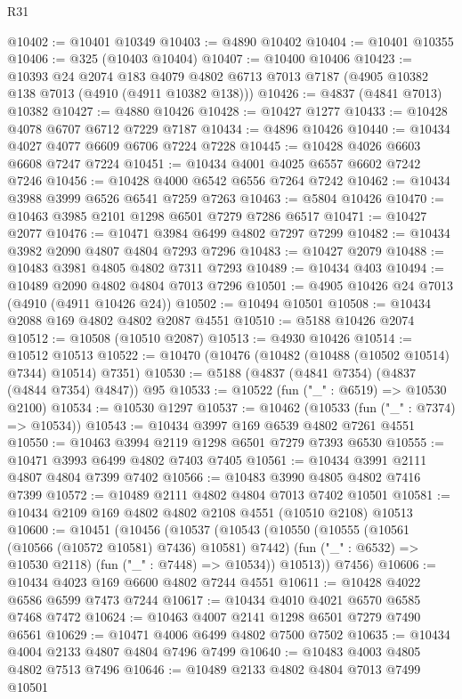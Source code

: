 \begin{lexlean}{R31}
\begin{coremodule}
@10402 := @10401 @10349
@10403 := @4890 @10402
@10404 := @10401 @10355
@10406 := @325 (@10403 @10404)
@10407 := @10400 @10406
@10423 := @10393
    @24
    @2074
    @183
    @4079
    @4802
    @6713
    @7013
    @7187
    (@4905 @10382 @138 @7013 (@4910 (@4911 @10382 @138)))
@10426 := @4837 (@4841 @7013) @10382
@10427 := @4880 @10426
@10428 := @10427 @1277
@10433 := @10428 @4078 @6707 @6712 @7229 @7187
@10434 := @4896 @10426
@10440 := @10434 @4027 @4077 @6609 @6706 @7224 @7228
@10445 := @10428 @4026 @6603 @6608 @7247 @7224
@10451 := @10434 @4001 @4025 @6557 @6602 @7242 @7246
@10456 := @10428 @4000 @6542 @6556 @7264 @7242
@10462 := @10434 @3988 @3999 @6526 @6541 @7259 @7263
@10463 := @5804 @10426
@10470 := @10463 @3985 @2101 @1298 @6501 @7279 @7286 @6517
@10471 := @10427 @2077
@10476 := @10471 @3984 @6499 @4802 @7297 @7299
@10482 := @10434 @3982 @2090 @4807 @4804 @7293 @7296
@10483 := @10427 @2079
@10488 := @10483 @3981 @4805 @4802 @7311 @7293
@10489 := @10434 @403
@10494 := @10489 @2090 @4802 @4804 @7013 @7296
@10501 := @4905 @10426 @24 @7013 (@4910 (@4911 @10426 @24))
@10502 := @10494 @10501
@10508 := @10434 @2088 @169 @4802 @4802 @2087 @4551
@10510 := @5188 @10426 @2074
@10512 := @10508 (@10510 @2087)
@10513 := @4930 @10426
@10514 := @10512 @10513
@10522 := @10470 (@10476 (@10482 (@10488 (@10502 @10514) @7344) @10514) @7351)
@10530 := @5188 (@4837 (@4841 @7354) (@4837 (@4844 @7354) @4847)) @95
@10533 := @10522 (fun ("_" : @6519) => @10530 @2100)
@10534 := @10530 @1297
@10537 := @10462 (@10533 (fun ("_" : @7374) => @10534))
@10543 := @10434 @3997 @169 @6539 @4802 @7261 @4551
@10550 := @10463 @3994 @2119 @1298 @6501 @7279 @7393 @6530
@10555 := @10471 @3993 @6499 @4802 @7403 @7405
@10561 := @10434 @3991 @2111 @4807 @4804 @7399 @7402
@10566 := @10483 @3990 @4805 @4802 @7416 @7399
@10572 := @10489 @2111 @4802 @4804 @7013 @7402 @10501
@10581 := @10434 @2109 @169 @4802 @4802 @2108 @4551 (@10510 @2108) @10513
@10600 := @10451
    (@10456
      (@10537
        (@10543
          (@10550
            (@10555 (@10561 (@10566 (@10572 @10581) @7436) @10581) @7442)
            (fun ("_" : @6532) => @10530 @2118)
            (fun ("_" : @7448) => @10534))
          @10513))
      @7456)
@10606 := @10434 @4023 @169 @6600 @4802 @7244 @4551
@10611 := @10428 @4022 @6586 @6599 @7473 @7244
@10617 := @10434 @4010 @4021 @6570 @6585 @7468 @7472
@10624 := @10463 @4007 @2141 @1298 @6501 @7279 @7490 @6561
@10629 := @10471 @4006 @6499 @4802 @7500 @7502
@10635 := @10434 @4004 @2133 @4807 @4804 @7496 @7499
@10640 := @10483 @4003 @4805 @4802 @7513 @7496
@10646 := @10489 @2133 @4802 @4804 @7013 @7499 @10501

\end{coremodule}
\end{lexlean}
